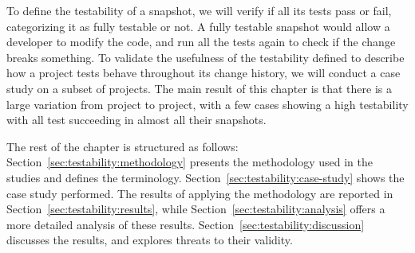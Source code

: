 To define the testability of a snapshot, we will verify if all its tests pass or fail, categorizing it as fully testable or not.
A fully testable snapshot would allow a developer to modify the code, and run all the tests again to check if the change breaks something.
To validate the usefulness of the testability defined to describe how a project tests behave throughout its change history, we will conduct a case study on a subset of projects.
The main result of this chapter is that there is a large variation from project to project, with a few cases showing a high testability with all test succeeding in almost all their snapshots.



The rest of the chapter is structured as follows:
Section~\ref{sec:testability:methodology} presents the methodology used in the studies and defines the terminology. 
Section~\ref{sec:testability:case-study} shows the case study performed.
The results of applying the methodology are reported in Section~\ref{sec:testability:results}, while Section~\ref{sec:testability:analysis} offers a more detailed analysis of these results.
Section~\ref{sec:testability:discussion} discusses the results, and explores threats to their validity.
